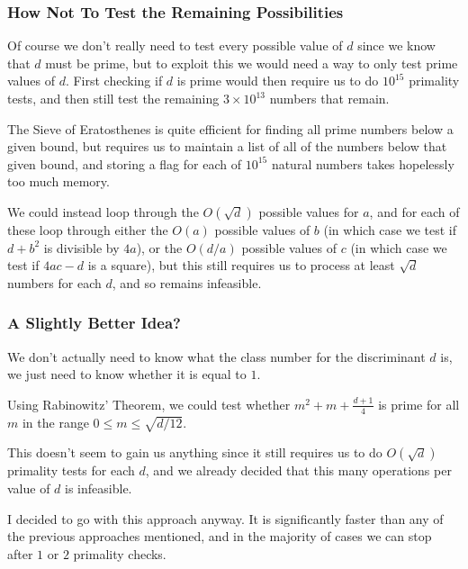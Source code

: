 \documentclass[handout]{beamer}
\begin{document}
\begin{frame}

	\frametitle{How Not To Test the Remaining Possibilities}

	Of course we don't really need to test every possible value of $d$ since we know that $d$ must be prime, but to exploit this we would need a way to only test prime values of $d$. First checking if $d$ is prime would then require us to do $10^{15}$ primality tests, and then still test the remaining $3 \times 10^{13}$ numbers that remain. \pause

	The Sieve of Eratosthenes is quite efficient for finding all prime numbers below a given bound, but requires us to maintain a list of all of the numbers below that given bound, and storing a flag for each of $10^{15}$ natural numbers takes hopelessly too much memory. \pause

	We could instead loop through the $O(\sqrt{d})$ possible values for $a$, and for each of these loop through either the $O(a)$ possible values of $b$ (in which case we test if $d + b^2$ is divisible by $4a$), or the $O(d/a)$ possible values of $c$ (in which case we test if $4ac - d$ is a square), but this still requires us to process at least $\sqrt{d}$ numbers for each $d$, and so remains infeasible.

\end{frame}

\begin{frame}

	\frametitle{A Slightly Better Idea?}

	We don't actually need to know what the class number for the discriminant $d$ is, we just need to know whether it is equal to $1$. \pause

	Using Rabinowitz' Theorem, we could test whether $m^2 + m + \frac{d + 1}{4}$ is prime for all $m$ in the range $0 \leq m \leq \sqrt{d/12}$. \pause

	This doesn't seem to gain us anything since it still requires us to do $O(\sqrt{d})$ primality tests for each $d$, and we already decided that this many operations per value of $d$ is infeasible. \pause

	I decided to go with this approach anyway. It is significantly faster than any of the previous approaches mentioned, and in the majority of cases we can stop after $1$ or $2$ primality checks.

\end{frame}
\end{document}
